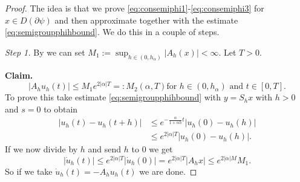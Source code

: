 \documentclass[a4paper,11pt, leqno]{scrreprt} %
\renewcommand{\leq}{\leqslant}
\renewcommand{\leq}{\leqslant}
\theoremstyle{change}
\theoremstyle{nonumberplain}
\newtheorem{proof}{Proof}
\begin{document}
\begin{proof}
  The idea is that we prove
  \eqref{eq:consemiphi1}-\eqref{eq:consemiphi3} for $x \in D(\partial
  \psi)$ and then approximate together with the estimate
  \eqref{eq:semigroupphihbound}. We do this in a couple of steps.
  
  \textit{Step 1.} By  we can set $M_1 := \sup_{h
    \in (0, h_\alpha)} |A_h(x)| < \infty$. Let $T > 0$.
  
  \textbf{Claim.}
  \begin{equation}
    \label{eq:boundahuh}
    |A_h u_h(t)| \leq M_1 e^{2|\alpha| T} =: M_2(\alpha, T) \text{
      for $h \in (0, h_\alpha)$ and $t \in [0, T]$}.
  \end{equation}
  To prove this take estimate \eqref{eq:semigroupphihbound} with $y =
  S_h x$ with $h > 0$ and $s = 0$ to obtain
  \begin{equation}
    \label{eq:semigroupestimatestep11}
    \begin{split}
      |u_h(t) - u_h(t + h)| &\leq e^{-\frac{\alpha}{1 + \alpha h} t}
      |u_h(0) - u_h(h)|\\
      &\leq e^{2 |\alpha| T} |u_h(0) - u_h(h)|.
    \end{split}
  \end{equation}
  If we now divide by $h$ and send $h$ to $0$ we get
  \begin{equation}
    \label{eq:semigroupestimatestep12}
    |\dot u_h(t)| \leq e^{2 |\alpha| T} |\dot u_h(0)| = e^{2 |\alpha|
      T} |A_h x| \leq e^{2 |\alpha| M} M_1.
  \end{equation}
  So if we take $\dot u_h(t) = -A_h u_h(t)$ we are done.
  

\end{proof}
\end{document}
